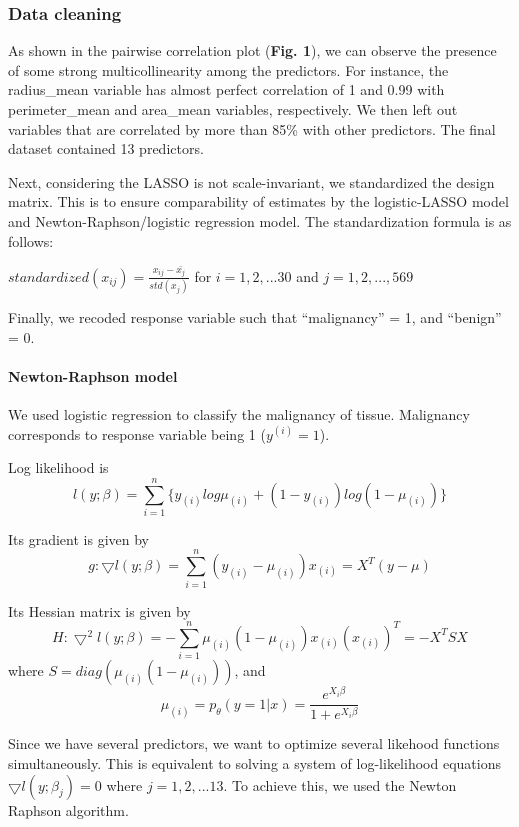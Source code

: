 \documentclass[]{article}
\let\oldparagraph\paragraph
\renewcommand{\paragraph}[1]{\oldparagraph{#1}\mbox{}}
\begin{document}
\hypertarget{data-cleaning}{%
\subsubsection{Data cleaning}\label{data-cleaning}}

As shown in the pairwise correlation plot (\textbf{Fig. 1}), we can
observe the presence of some strong multicollinearity among the
predictors. For instance, the radius\_mean variable has almost perfect
correlation of 1 and 0.99 with perimeter\_mean and area\_mean variables,
respectively. We then left out variables that are correlated by more
than 85\% with other predictors. The final dataset contained 13
predictors.

Next, considering the LASSO is not scale-invariant, we standardized the
design matrix. This is to ensure comparability of estimates by the
logistic-LASSO model and Newton-Raphson/logistic regression model. The
standardization formula is as follows:

\(standardized(x_{ij}) = \frac{x_{ij} - \bar{x_{j}}}{std(x_{j})}\) for
\(i = 1,2,...30\) and \(j = 1,2,..., 569\)

Finally, we recoded response variable such that ``malignancy'' = 1, and
``benign'' = 0.

\hypertarget{newton-raphson-model}{%
\paragraph{Newton-Raphson model}\label{newton-raphson-model}}

We used logistic regression to classify the malignancy of tissue.
Malignancy corresponds to response variable being 1 (\(y^{(i)} = 1\)).

Log likelihood is
\[l(y;\beta) = \sum^n_{i = 1} \{y_{(i)} log\mu_{(i)} + (1 - y_{(i)}) log(1 - \mu_{(i)})\}\]

Its gradient is given by
\[g: \bigtriangledown l(y;\beta) = \sum^n_{i = 1} (y_{(i)} - \mu_{(i)}) x_{(i)} = X^T(y - \mu)\]

Its Hessian matrix is given by
\[H: \bigtriangledown^2 l(y;\beta) = -\sum^n_{i = 1} \mu_{(i)} (1 - \mu_{(i)}) x_{(i)} (x_{(i)})^T = -X^TSX\]
where \(S = diag(\mu_{(i)} (1 - \mu_{(i)}))\), and
\[\mu_{(i)} = p_{\theta}(y = 1|x) = \frac{e^{X_{i}\beta}}{1+e^{X_{i}\beta}}\]

Since we have several predictors, we want to optimize several likehood
functions simultaneously. This is equivalent to solving a system of
log-likelihood equations \(\bigtriangledown l(y;\beta_{j}) = 0\) where
\(j = 1,2,...13\). To achieve this, we used the Newton Raphson
algorithm.
\end{document}
